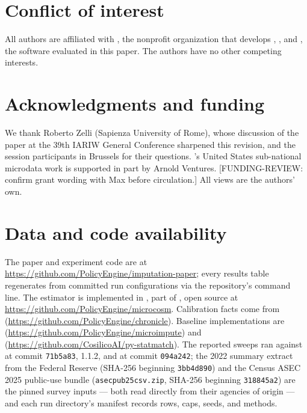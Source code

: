 \section*{Conflict of interest}

All authors are affiliated with \policyengine{}, the nonprofit organization
that develops \populace{}, \populacefit{}, and \microimpute{}, the software
evaluated in this paper. The authors have no other competing interests.

\section*{Acknowledgments and funding}

We thank Roberto Zelli (Sapienza University of Rome), whose
discussion of the paper at the 39th IARIW General Conference
sharpened this revision, and the session participants in Brussels for
their questions. \policyengine{}'s United States sub-national
microdata work is supported in part by Arnold Ventures.
[FUNDING-REVIEW: confirm grant wording with Max before circulation.]
All views are the authors' own.

\section*{Data and code availability}

The paper and experiment code are at
\url{https://github.com/PolicyEngine/imputation-paper}; every results table
regenerates from committed run configurations via the repository's command
line. The estimator is implemented in \populacefit{}, part of \populace{},
open source at \url{https://github.com/PolicyEngine/microcosm}. Calibration
facts come from \chronicle{}
(\url{https://github.com/PolicyEngine/chronicle}). Baseline implementations
are \microimpute{}
(\url{https://github.com/PolicyEngine/microimpute}) and \pystatmatch{}
(\url{https://github.com/CosilicoAI/py-statmatch}). The reported sweeps ran
against \populacefit{} at \populace{} commit \texttt{71b5a83},
\microimpute{} 1.1.2, and \pystatmatch{} at commit \texttt{094a242}; the
\scf{} 2022 summary extract from the Federal Reserve (SHA-256 beginning
\texttt{3bb4d890}) and the Census ASEC 2025 public-use bundle
(\texttt{asecpub25csv.zip}, SHA-256 beginning \texttt{318845a2}) are the
pinned survey inputs --- both read directly from their agencies of origin ---
and each run directory's manifest records rows, caps, seeds, and methods.
